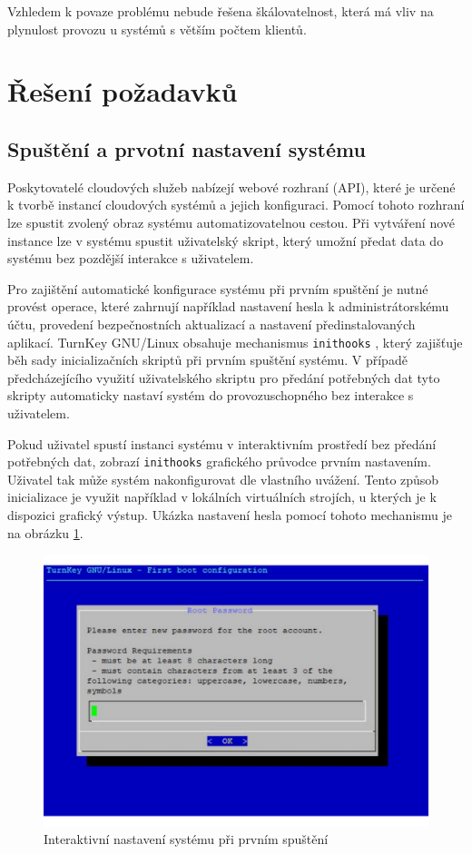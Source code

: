 Vzhledem k povaze problému nebude řešena škálovatelnost, která má vliv na plynulost provozu u systémů s větším počtem klientů.

\section{Řešení požadavků}

\subsection{Spuštění a prvotní nastavení systému}

Poskytovatelé cloudových služeb nabízejí webové rozhraní (API), které je určené k tvorbě instancí cloudových systémů a jejich konfiguraci.
Pomocí tohoto rozhraní lze spustit zvolený obraz systému automatizovatelnou cestou. Při vytváření nové instance lze v systému spustit uživatelský skript,
který umožní předat data do systému bez pozdější interakce s uživatelem.

Pro zajištění automatické konfigurace systému při prvním spuštění je nutné provést operace, které zahrnují například nastavení hesla k administrátorskému účtu,
provedení bezpečnostních aktualizací a nastavení předinstalovaných aplikací.
TurnKey GNU/Linux obsahuje mechanismus \texttt{inithooks} \cite{inithooks}, který zajišťuje běh sady inicializačních skriptů při prvním spuštění systému.
V případě předcházejícího využití uživatelského skriptu pro předání potřebných dat tyto skripty automaticky nastaví systém do provozuschopného bez interakce s uživatelem.

Pokud uživatel spustí instanci systému v interaktivním prostředí bez předání potřebných dat, zobrazí \texttt{inithooks} grafického průvodce prvním nastavením.
Uživatel tak může systém nakonfigurovat dle vlastního uvážení. Tento způsob inicializace je využit například v lokálních virtuálních strojích, u kterých je k dispozici
grafický výstup. Ukázka nastavení hesla pomocí tohoto mechanismu je na obrázku \ref{fig:inithooks-password}.

\begin{figure}[h]
    \centering
    \includegraphics[width=1\linewidth]{chapters/images/root-pass.pdf}
    \caption{Interaktivní nastavení systému při prvním spuštění \cite{turnkey}}
    \label{fig:inithooks-password}
\end{figure}

